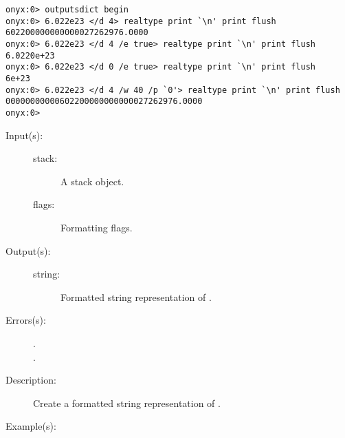 \begin{description}
\begin{description}
\begin{verbatim}
onyx:0> outputsdict begin
onyx:0> 6.022e23 </d 4> realtype print `\n' print flush
602200000000000027262976.0000
onyx:0> 6.022e23 </d 4 /e true> realtype print `\n' print flush
6.0220e+23
onyx:0> 6.022e23 </d 0 /e true> realtype print `\n' print flush
6e+23
onyx:0> 6.022e23 </d 4 /w 40 /p `0'> realtype print `\n' print flush
00000000000602200000000000027262976.0000
onyx:0>
		\end{verbatim}
	\end{description}
\label{outputsdict:stacktype}
\item[{\onyxop{stack flags}{stacktype}{string}}: ]
	\begin{description}\item[]
	\item[Input(s): ]
		\begin{description}\item[]
		\item[stack: ]
			A stack object.
		\item[flags: ]
			Formatting flags.
		\end{description}
	\item[Output(s): ]
		\begin{description}\item[]
		\item[string: ]
			Formatted string representation of .
		\end{description}
	\item[Errors(s): ]
		\begin{description}\item[]
		\item[.]
		\item[.]
		\end{description}
	\item[Description: ]
		Create a formatted string representation of .
	\item[Example(s): ]\begin{verbatim}


\end{verbatim}
\end{description}
\end{description}
